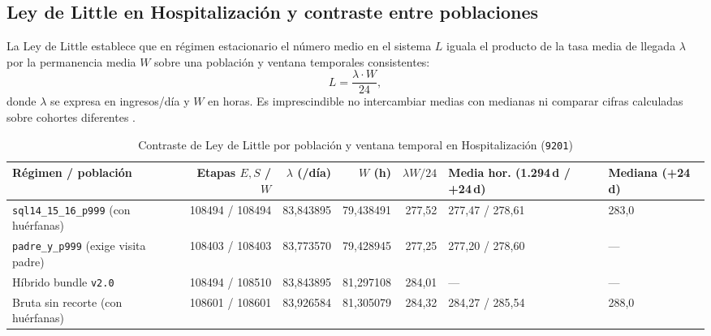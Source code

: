 \subsection{Ley de Little en Hospitalización y contraste entre poblaciones}

La Ley de Little \parencite{little1961} establece que en régimen estacionario el número medio en el sistema $L$ iguala el producto de la tasa media de llegada $\lambda$ por la permanencia media $W$ sobre una población y ventana temporales consistentes:
\begin{equation}
\label{eq:little}
L = \frac{\lambda \cdot W}{24},
\end{equation}
donde $\lambda$ se expresa en ingresos/día y $W$ en horas. Es imprescindible no intercambiar medias con medianas ni comparar cifras calculadas sobre cohortes diferentes \parencite{mediflow2026informe}.

\begin{table}[htbp]
\caption{Contraste de Ley de Little por población y ventana temporal en Hospitalización (\texttt{9201})}
\label{tab:little_poblaciones}
{\singlespacing\footnotesize
\begin{tabularx}{\textwidth}{@{}Y r r r r R{2.1cm} R{1.35cm}@{}}
\toprule
Régimen / población & Etapas $E,S$ / $W$ & $\lambda$ (/día) & $W$ (h) & $\lambda W/24$ & Media hor. (1.294\,d / +24\,d) & Mediana (+24\,d) \\
\midrule
\nolinkurl{sql14_15_16_p999} (con huérfanas) & \num{108494} / \num{108494} & 83,843895 & 79,438491 & 277,52 & 277,47 / 278,61 & 283,0 \\
\nolinkurl{padre_y_p999} (exige visita padre) & \num{108403} / \num{108403} & 83,773570 & 79,428945 & 277,25 & 277,20 / 278,60 & --- \\
Híbrido bundle \texttt{v2.0} & \num{108494} / \num{108510} & 83,843895 & 81,297108 & 284,01 & --- & --- \\
Bruta sin recorte (con huérfanas) & \num{108601} / \num{108601} & 83,926584 & 81,305079 & 284,32 & 284,27 / 285,54 & 288,0 \\
\bottomrule
\end{tabularx}}
\end{table}

